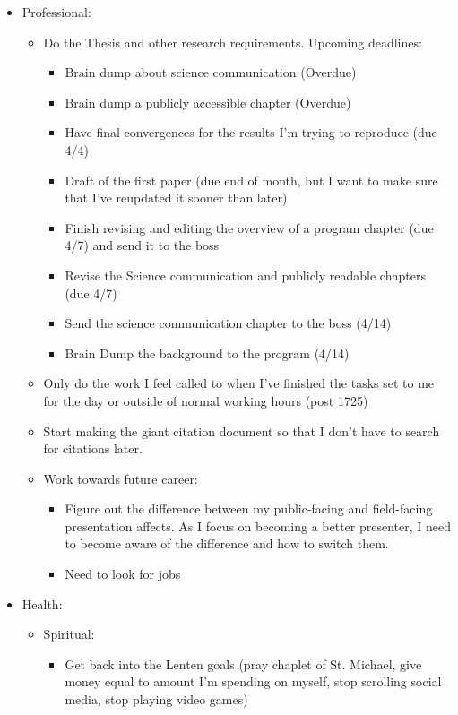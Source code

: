 \documentclass[12pt]{article}[titlepage]
\renewcommand{\,}{\textsuperscript{,}}
\begin{document}
\begin{itemize}
\begin{itemize}
\end{itemize}  
\item Professional:   
\begin{itemize}   
\item Do the Thesis and other research requirements. Upcoming deadlines:  
\begin{itemize}  
\item Brain dump about science communication (Overdue)  
\item Brain dump a publicly accessible chapter (Overdue)  
\item Have final convergences for the results I'm trying to reproduce (due 4/4)  
\item Draft of the first paper (due end of month, but I want to make sure that I've reupdated it sooner than later)  
\item Finish revising and editing the overview of a program chapter (due 4/7) and send it to the boss  
\item Revise the Science communication and publicly readable chapters (due 4/7)  
\item Send the science communication chapter to the boss (4/14)  
\item Brain Dump the background to the program (4/14)  
\end{itemize}  
\item Only do the work I feel called to when I've finished the tasks set to me for the day or outside of normal working hours (post 1725)  
\item Start making the giant citation document so that I don't have to search for citations later.  
\item Work towards future career:   
\begin{itemize}   
\item Figure out the difference between my public-facing and field-facing presentation affects. As I focus on becoming a better presenter, I need to become aware of the difference and how to switch them.  
\item Need to look for jobs  
\end{itemize}   
\end{itemize}   
\item Health:  
\begin{itemize}   
\item Spiritual:   
\begin{itemize}   
\item Get back into the Lenten goals (pray chaplet of St. Michael, give money equal to amount I'm spending on myself, stop scrolling social media, stop playing video games)  

\end{itemize}
\end{itemize}
\end{itemize}
\end{document}
